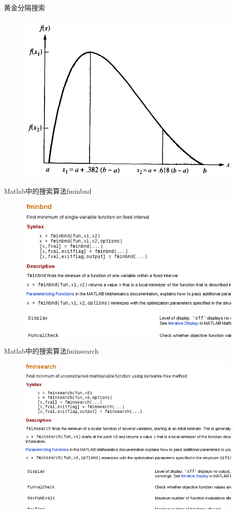 \documentclass[UTF8]{ctexbeamer}
\begin{document}
\begin{frame}{黄金分隔搜索}
  \begin{figure}
    \includegraphics[height=.8\textheight{}]{gold.png}
  \end{figure}    
\end{frame}

\begin{frame}{Matlab中的搜索算法fminbnd}
  \begin{figure}
    \includegraphics[height=.8\textheight{}]{fminbnd.png}
  \end{figure}      
\end{frame}

\begin{frame}{Matlab中的搜索算法fminsearch}
  \begin{figure}
    \includegraphics[height=.8\textheight{}]{fminsearch.png}
  \end{figure}      
\end{frame}
\end{document}
